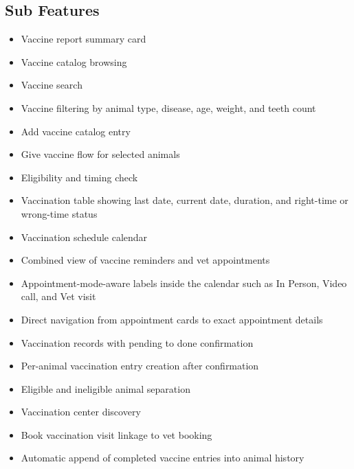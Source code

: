 \documentclass[12pt]{article}
\begin{document}
\subsection{Sub Features}
\begin{itemize}
    \item Vaccine report summary card
    \item Vaccine catalog browsing
    \item Vaccine search
    \item Vaccine filtering by animal type, disease, age, weight, and teeth count
    \item Add vaccine catalog entry
    \item Give vaccine flow for selected animals
    \item Eligibility and timing check
    \item Vaccination table showing last date, current date, duration, and right-time or wrong-time status
    \item Vaccination schedule calendar
    \item Combined view of vaccine reminders and vet appointments
    \item Appointment-mode-aware labels inside the calendar such as In Person, Video call, and Vet visit
    \item Direct navigation from appointment cards to exact appointment details
    \item Vaccination records with pending to done confirmation
    \item Per-animal vaccination entry creation after confirmation
    \item Eligible and ineligible animal separation
    \item Vaccination center discovery
    \item Book vaccination visit linkage to vet booking
    \item Automatic append of completed vaccine entries into animal history
\end{itemize}
\end{document}
